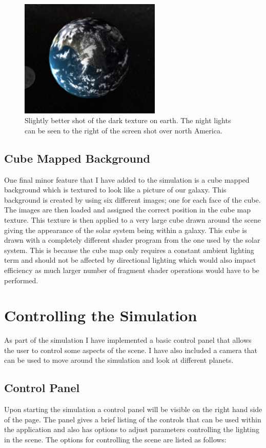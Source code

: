 \documentclass[paper=a4, fontsize=11pt]{scrartcl}	%
\numberwithin{equation}{section}															%
\numberwithin{figure}{section}																%
\numberwithin{table}{section}																%
\begin{document}
\begin{figure}[H]
\centering
\includegraphics[width=0.6\textwidth]{img/earth_dark.png}
\caption{Slightly better shot of the dark texture on earth. The night lights can be seen to the right of the screen shot over north America.}
\label{fig:earth-dark}
\end{figure}

\subsection{Cube Mapped Background}
One final minor feature that I have added to the simulation is a cube mapped background which is textured to look like a picture of our galaxy. This background is created by using six different images; one for each face of the cube. The images are then loaded and assigned the correct position in the cube map texture. This texture is then applied to a very large cube drawn around the scene giving the appearance of the solar system being within a galaxy. This cube is drawn with a completely different shader program from the one used by the solar system. This is because the cube map only requires a constant ambient lighting term and should not be affected by directional lighting which would also impact efficiency as much larger number of fragment shader operations would have to be performed.

\section{Controlling the Simulation}
\label{sec:controlling-the-simulation}
As part of the simulation I have implemented a basic control panel that allows the user to control some aspects of the scene. I have also included a camera that can be used to move around the simulation and look at different planets.

\subsection{Control Panel}
Upon starting the simulation a control panel will be visible on the right hand side of the page. The panel gives a brief listing of the controls that can be used within the application and also has options to adjust parameters controlling the lighting in the scene. The options for controlling the scene are listed as follows:
\end{document}
